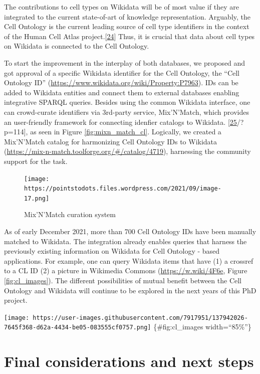 The contributions to cell types on Wikidata will be of most value if they are integrated to the current state-of-art of knowledge representation.
Arguably, the Cell Ontology is the current leading source of cell type identifiers in the context of the Human Cell Atlas project.{[}\protect\hyperlink{ref-qT8WxqjA}{24}{]}
Thus, it is crucial that data about cell types on Wikidata is connected to the Cell Ontology.

To start the improvement in the interplay of both databases, we proposed and got approval of a specific Wikidata identifier for the Cell Ontology, the ``Cell Ontology ID'' (\url{https://www.wikidata.org/wiki/Property:P7963}).
IDs can be added to Wikidata entities and connect them to external databases enabling integrative SPARQL queries.
Besides using the common Wikidata interface, one can crowd-curate identifiers via 3rd-party service, Mix'N'Match, which provides an user-friendly framework for connecting idenfier catalogs to Wikidata. {[}\protect\hyperlink{ref-JgiKEEdq}{25}/?p=114{]}, as seen in Figure \ref{fig:mixn_match_cl}.
Logically, we created a Mix'N'Match catalog for harmonizing Cell Ontology IDs to Wikidata (\url{https://mix-n-match.toolforge.org/\#/catalog/4719}), harnessing the community support for the task.

\begin{figure}
\hypertarget{fig:mixnmatch_cl}{%
\centering
\texttt{[image: https://pointstodots.files.wordpress.com/2021/09/image-17.png]}
\caption{Mix'N'Match curation system}\label{fig:mixnmatch_cl}
}
\end{figure}

As of early December 2021, more than 700 Cell Ontology IDs have been manually matched to Wikidata.
The integration already enables queries that harness the previously existing information on Wikidata for Cell Ontology - based applications.
For example, one can query Wikidata items that have (1) a crossref to a CL ID (2) a picture in Wikimedia Commons (\url{https://w.wiki/4F6e}, Figure \ref{fig:cl_images}).
The different possibilities of mutual benefit between the Cell Ontology and Wikidata will continue to be explored in the next years of this PhD project.

\texttt{[image: https://user-images.githubusercontent.com/7917951/137942026-7645f368-d62a-4434-be05-083555cf0757.png]} \{\#fig:cl\_images width=``85\%''\}

\hypertarget{final-considerations-and-next-steps}{%
\section{Final considerations and next steps}\label{final-considerations-and-next-steps}}

